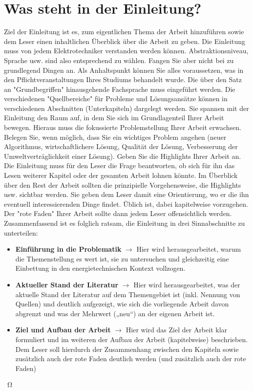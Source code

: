 \section{Was steht in der Einleitung?}
\label{sec: WsidE}
Ziel der Einleitung ist es, zum eigentlichen Thema der Arbeit hinzuführen sowie dem Leser einen inhaltlichen Überblick über die Arbeit zu geben. Die Einleitung muss von jedem Elektrotechniker verstanden werden können. Abstraktionsniveau, Sprache usw. sind also entsprechend zu wählen.
Fangen Sie aber nicht bei zu grundlegend Dingen an. Als Anhaltspunkt können Sie alles voraussetzen, was in den Pflichtveranstaltungen Ihres Studiums behandelt wurde. Die über den Satz an "Grundbegriffen" hinausgehende Fachsprache muss eingeführt werden. Die verschiedenen "Quellbereiche" für Probleme und Lösungsansätze können in verschiedenen Abschnitten (Unterkapiteln) dargelegt werden. Sie spannen mit der Einleitung den Raum auf, in dem Sie sich im Grundlagenteil Ihrer Arbeit bewegen. Hieraus muss die fokussierte Problemstellung Ihrer Arbeit erwachsen. Belegen Sie, wenn möglich, dass Sie ein wichtiges Problem angehen (neuer Algorithmus, wirtschaftlichere Lösung, Qualität der Lösung, Verbesserung der Umweltverträglichkeit einer Lösung). Geben Sie die Highlights Ihrer Arbeit an. Die Einleitung muss für den Leser die Frage beantworten, ob sich für ihn das Lesen weiterer Kapitel oder der gesamten Arbeit lohnen könnte. Im Überblick über den Rest der Arbeit sollten die prinzipielle Vorgehensweise, die Highlights usw. sichtbar werden. Sie geben dem Leser damit eine Orientierung, wo er die ihn eventuell interessierenden Dinge findet. Üblich ist, dabei kapitelweise vorzugehen. Der "rote Faden" Ihrer Arbeit sollte dann jedem Leser offensichtlich werden.
Zusammenfassend ist es folglich ratsam, die Einleitung in drei Sinnabschnitte zu unterteilen:
\begin{itemize}
    \item{\textbf{Einführung in die Problematik } $\boldsymbol{\rightarrow{}}$   Hier wird herausgearbeitet, warum die Themenstellung es wert ist, sie zu untersuchen und gleichzeitig eine Einbettung in den energietechnischen Kontext vollzogen.}
    \item{ \textbf{Aktueller Stand der Literatur } $\boldsymbol{\rightarrow{}}$  Hier wird herausgearbeitet, was der aktuelle Stand der Literatur auf dem Themengebiet ist (inkl. Nennung von Quellen) und deutlich aufgezeigt, wie sich die vorliegende Arbeit davon abgrenzt und was der Mehrwert („neu“) an der eigenen Arbeit ist.}
    \item{\textbf{Ziel und Aufbau der Arbeit} $\boldsymbol{\rightarrow{}}$  Hier wird das Ziel der Arbeit klar formuliert und im weiteren der Aufbau der Arbeit (kapitelweise) beschrieben. Dem Leser soll hierdurch der Zusammenhang zwischen den Kapiteln sowie zusätzlich auch der rote Faden deutlich werden (und zusätzlich auch der rote Faden)}
\end{itemize}

\SI{}{\ohm}



